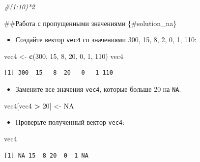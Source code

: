 \documentclass[
]{book}
\newenvironment{Shaded}{\begin{snugshade}}{\end{snugshade}}
\newcommand{\CommentTok}[1]{\textcolor[rgb]{0.56,0.35,0.01}{\textit{#1}}}
\newcommand{\DecValTok}[1]{\textcolor[rgb]{0.00,0.00,0.81}{#1}}
\newcommand{\KeywordTok}[1]{\textcolor[rgb]{0.13,0.29,0.53}{\textbf{#1}}}
\newcommand{\NormalTok}[1]{#1}
\newcommand{\OperatorTok}[1]{\textcolor[rgb]{0.81,0.36,0.00}{\textbf{#1}}}
\newcommand{\OtherTok}[1]{\textcolor[rgb]{0.56,0.35,0.01}{#1}}
\newcommand{\StringTok}[1]{\textcolor[rgb]{0.31,0.60,0.02}{#1}}
\providecommand{\tightlist}{%
  \setlength{\itemsep}{0pt}\setlength{\parskip}{0pt}}
\begin{document}
\begin{Shaded}
\begin{Highlighting}[]
\CommentTok{#(1:10)*2}
\end{Highlighting}
\end{Shaded}

\#\#Работа с пропущенными значениями \{\#solution\_na\}

\begin{itemize}
\tightlist
\item
  Создайте вектор \texttt{vec4} со значениями 300, 15, 8, 2, 0, 1, 110:
\end{itemize}

\begin{Shaded}
\begin{Highlighting}[]
\NormalTok{vec4 <-}\StringTok{ }\KeywordTok{c}\NormalTok{(}\DecValTok{300}\NormalTok{, }\DecValTok{15}\NormalTok{, }\DecValTok{8}\NormalTok{, }\DecValTok{20}\NormalTok{, }\DecValTok{0}\NormalTok{, }\DecValTok{1}\NormalTok{, }\DecValTok{110}\NormalTok{)}
\NormalTok{vec4}
\end{Highlighting}
\end{Shaded}

\begin{verbatim}
[1] 300  15   8  20   0   1 110
\end{verbatim}

\begin{itemize}
\tightlist
\item
  Замените все значения \texttt{vec4}, которые больше 20 на \texttt{NA}.
\end{itemize}

\begin{Shaded}
\begin{Highlighting}[]
\NormalTok{vec4[vec4 }\OperatorTok{>}\StringTok{ }\DecValTok{20}\NormalTok{] <-}\StringTok{ }\OtherTok{NA}
\end{Highlighting}
\end{Shaded}

\begin{itemize}
\tightlist
\item
  Проверьте полученный вектор \texttt{vec4}:
\end{itemize}

\begin{Shaded}
\begin{Highlighting}[]
\NormalTok{vec4}
\end{Highlighting}
\end{Shaded}

\begin{verbatim}
[1] NA 15  8 20  0  1 NA
\end{verbatim}
\end{document}
